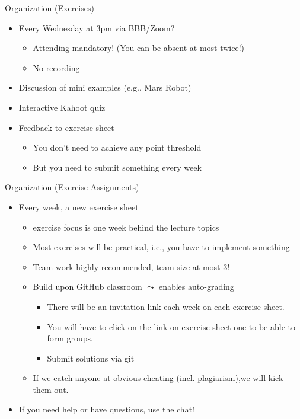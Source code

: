 \begin{frame}[c]{Organization (Exercises)}
	
	\begin{itemize}
		\item Every Wednesday at 3pm via BBB/Zoom?
		\begin{itemize}
			\item Attending mandatory! (You can be absent at most twice!)
			\item No recording
		\end{itemize}
		\pause
		\item Discussion of mini examples (e.g., Mars Robot)
		\pause
		\item Interactive Kahoot quiz
		\pause
		\item Feedback to exercise sheet
		\begin{itemize}
			\item You don't need to achieve any point threshold
			\item But you need to submit something every week
		\end{itemize}
	
	\end{itemize}
	
\end{frame}
\begin{frame}[c]{Organization (Exercise Assignments)}
	
	\begin{itemize}
	\item Every week, a new exercise sheet
	\begin{itemize}
		\item exercise focus is one week behind the lecture topics
		\item Most exercises will be practical, i.e., you have to implement something
		\item Team work highly recommended, team size at most 3! 
		\pause
		\item Build upon GitHub classroom $\leadsto$ enables auto-grading
		\begin{itemize}
			\item There will be an invitation link each week on each exercise sheet.
			\item You will have to click on the link on exercise sheet one to be able to form groups.
			\item Submit solutions via git
		\end{itemize}
		\pause
		\item If we catch anyone at obvious cheating (incl. plagiarism),\newline we will kick them out.
	\end{itemize}
	\pause
	\item \alert{If you need help or have questions, use the chat!}
	\end{itemize}
	
\end{frame}
